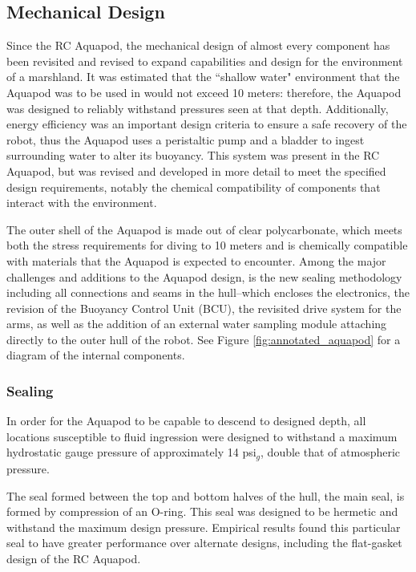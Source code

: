 \subsection{ Mechanical Design}

Since the RC Aquapod, the mechanical design of almost every component has been
revisited and revised to expand capabilities and design for the environment of a marshland.  It was estimated
that the ``shallow water" environment that the Aquapod was to be used in would
not exceed 10 meters: therefore, the Aquapod was designed to reliably withstand
pressures seen at that depth.  Additionally, energy efficiency was an important
design criteria to ensure a safe recovery of the robot, thus the Aquapod uses a
peristaltic pump and a bladder to ingest surrounding water to alter its
buoyancy.  This system was present in the RC Aquapod, but was revised and
developed in more detail to meet the specified design requirements, notably the
chemical compatibility of components that interact with the environment.

The outer shell of the Aquapod is made out of clear polycarbonate, which meets
both the stress requirements for diving to 10 meters and is chemically
compatible with materials that the Aquapod is expected to encounter.  Among the
major challenges and additions to the Aquapod design, is the new sealing
methodology including all connections and seams in the hull--which encloses the
electronics, the revision of the Buoyancy Control Unit (BCU), the revisited
drive system for the arms, as well as the addition of an external water sampling
module attaching directly to the outer hull of the robot. See Figure
\ref{fig:annotated_aquapod} for a diagram of the internal components.

  \subsubsection{Sealing} In order for the Aquapod to be capable to descend to
  designed depth, all locations susceptible to fluid ingression were designed to
  withstand a maximum hydrostatic gauge pressure of approximately 14 psi\(_g\),
  double that of atmospheric pressure.

    The seal formed between the top and bottom halves of the hull, the main
    seal, is formed by compression of an O-ring. This seal was designed to be
    hermetic and withstand the maximum design pressure.  Empirical results found
    this particular seal to have greater performance over alternate designs,
    including the flat-gasket design of the RC Aquapod.

